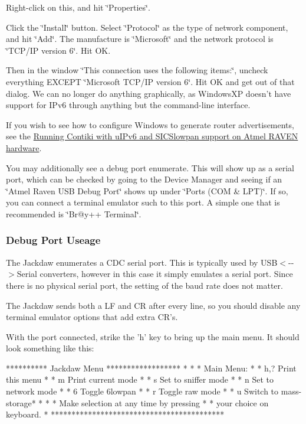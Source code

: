 \-Right-\/click on this, and hit \char`\"{}\-Properties\char`\"{}.

\-Click the \char`\"{}\-Install\char`\"{} button. \-Select \char`\"{}\-Protocol\char`\"{} as the type of network component, and hit \char`\"{}\-Add\char`\"{}. \-The manufacture is \char`\"{}\-Microsoft\char`\"{} and the network protocol is \char`\"{}\-T\-C\-P/\-I\-P version 6\char`\"{}. \-Hit \-O\-K.

\-Then in the window \char`\"{}\-This connection uses the following items\-:\char`\"{}, uncheck everything \-E\-X\-C\-E\-P\-T \char`\"{}\-Microsoft T\-C\-P/\-I\-P version 6\char`\"{}. \-Hit \-O\-K and get out of that dialog. \-We can no longer do anything graphically, as \-Windows\-X\-P doesn't have support for \-I\-Pv6 through anything but the command-\/line interface.

\-If you wish to see how to configure \-Windows to generate router advertisements, see the \hyperlink{a00058}{\-Running \-Contiki with u\-I\-Pv6 and \-S\-I\-C\-Slowpan support on \-Atmel \-R\-A\-V\-E\-N hardware}.

\-You may additionally see a debug port enumerate. \-This will show up as a serial port, which can be checked by going to the \-Device \-Manager and seeing if an \char`\"{}\-Atmel Raven U\-S\-B Debug Port\char`\"{} shows up under \char`\"{}\-Ports (\-C\-O\-M \& L\-P\-T)\char`\"{}. \-If so, you can connect a terminal emulator such to this port. \-A simple one that is recommended is \char`\"{}\-Br@y++ Terminal\char`\"{}.\hypertarget{a00053_DebugPort}{}\subsubsection{\-Debug Port Useage}\label{a00053_DebugPort}
\-The \-Jackdaw enumerates a \-C\-D\-C serial port. \-This is typically used by \-U\-S\-B$<$-\/-\/$>$\-Serial converters, however in this case it simply emulates a serial port. \-Since there is no physical serial port, the setting of the baud rate does not matter.

\-The \-Jackdaw sends both a \-L\-F and \-C\-R after every line, so you should disable any terminal emulator options that add extra \-C\-R's.

\-With the port connected, strike the 'h' key to bring up the main menu. \-It should look something like this\-:

\begin{DoxyVerb}
********** Jackdaw Menu ******************
*                                        *
* Main Menu:                             *
*  h,?             Print this menu       *
*  m               Print current mode    *
*  s               Set to sniffer mode   *
*  n               Set to network mode   *
*  6               Toggle 6lowpan        *
*  r               Toggle raw mode       *
*  u               Switch to mass-storage*
*                                        *
* Make selection at any time by pressing *
* your choice on keyboard.               *
******************************************
\end{DoxyVerb}


